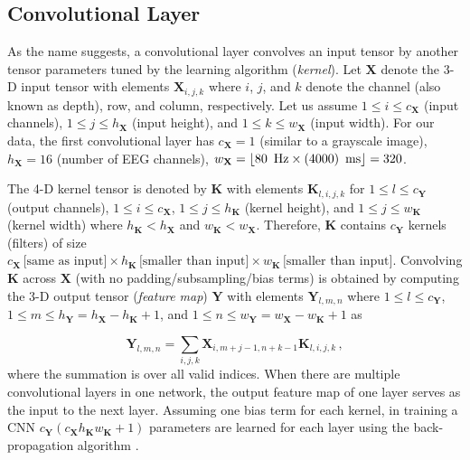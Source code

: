\documentclass{ieeeaccess}
\begin{document}
    \subsection{Convolutional Layer} \label{ConvNetsec}
    {As the name suggests, a convolutional layer convolves an input tensor by another tensor parameters tuned by the learning algorithm (\textit{kernel}). Let $\mathbf{\mathbf{X}}$ denote the 3-D input tensor with elements $\mathbf{\mathbf{X}}_{i, j, k}$ where $i$, $j$, and $k$ denote the channel (also known as depth), row, and column, respectively. Let us assume $1\leq i \leq c_{\mathbf{X}}$ (input channels),  $1\leq j \leq h_{\mathbf{X}}$ (input height),  and $1\leq k \leq w_{\mathbf{X}}$ (input width). For our data, the first convolutional layer has $c_{\mathbf{X}}=1$ (similar to a grayscale image),  $h_{\mathbf{X}}=16$ (number of EEG channels),  $w_{\mathbf{X}}=\lfloor 80\text{\, Hz} \times (4000) \text{\, ms} \rfloor=320$. }
    
    {The 4-D kernel tensor is denoted by $\mathbf{\mathbf{K}}$ with elements $\mathbf{\mathbf{K}}_{l, i, j, k}$ for $1\leq l \leq c_{\mathbf{Y}}$ (output channels),  $1\leq i \leq c_{\mathbf{X}}$,  $1\leq j \leq h_{\mathbf{K}}$ (kernel height),  and $1\leq j \leq w_{\mathbf{K}}$ (kernel width) where $h_{\mathbf{K}}< h_{\mathbf{X}}$ and $w_{\mathbf{K}}< w_{\mathbf{X}}$. Therefore, $\mathbf{\mathbf{K}}$ contains $c_{\mathbf{Y}}$ kernels (filters) of size $c_{\mathbf{X}}\, \text{[same as input]} \times h_{\mathbf{K}}\, \text{[smaller than input]} \times w_{\mathbf{K}} \, \text{[smaller than input]}$. Convolving $\mathbf{\mathbf{K}}$ across $\mathbf{\mathbf{X}}$ (with no padding/subsampling/bias terms) is obtained by computing the 3-D output tensor (\textit{feature map}) $\mathbf{\mathbf{Y}}$ with elements $\mathbf{\mathbf{Y}}_{l, m, n}$ where $1\leq l \leq c_{\mathbf{Y}}$,  $1\leq m \leq h_{\mathbf{Y}} = h_{\mathbf{X}}-h_{\mathbf{K}}+1$,  and $1\leq n \leq w_{\mathbf{Y}} = w_{\mathbf{X}}-w_{\mathbf{K}}+1$ as }
    
    \begin{equation}
    \mathbf{\mathbf{Y}}_{l, m, n} = \sum_{i, j, k} \mathbf{\mathbf{X}}_{i, m+j-1, n+k-1} \mathbf{\mathbf{K}}_{l, i, j, k}\, , 
    \label{observations}
    \end{equation}
    where the summation is over all valid indices. When there are multiple convolutional layers in one network,  the output feature map of one layer serves as the input to the next layer. Assuming one bias term for each kernel, in training a CNN $c_{\mathbf{Y}} (c_{\mathbf{X}}  h_{\mathbf{K}} w_{\mathbf{K}} + 1)$ parameters are learned for each layer using the back-propagation algorithm \cite{witten17}.
    
\end{document}
